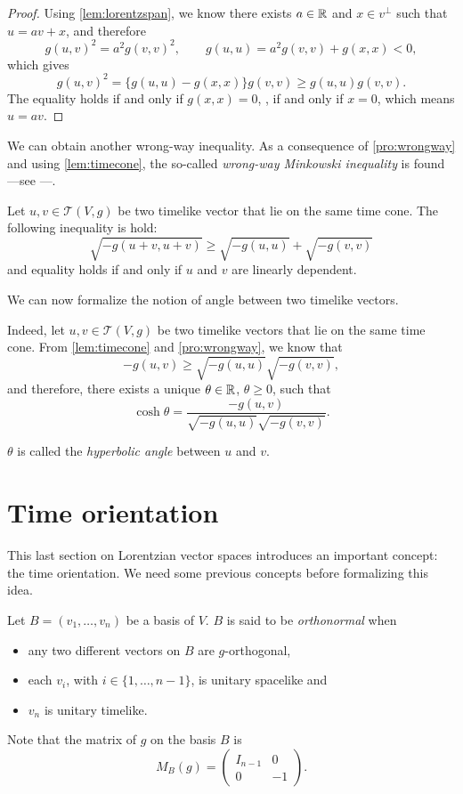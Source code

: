 \begin{proof}
    Using \autoref{lem:lorentzspan}, we know there exists $a \in \mathbb{R}$ and $x \in v^\perp$ such that $u=av+x$, and therefore
    \[
        g(u,v)^2=a^2g(v,v)^2, \quad \quad g(u,u)=a^2g(v,v)+g(x,x)<0,
    \]
    which gives
    \[
        g(u,v)^2=\{g(u,u)-g(x,x)\}g(v,v) \geq g(u,u)g(v,v).
    \]
    The equality holds if and only if $g(x,x)=0$, \ie, if and only if $x=0$, which means $u=av$.
\end{proof}


We can obtain another wrong-way inequality. As a consequence of \autoref{pro:wrongway} and using \autoref{lem:timecone}, the so-called \emph{wrong-way Minkowski inequality} is found ---see \cite[Cor. 5.31]{oneill83}---.

\begin{corollary}
	\label{Minkowski}
    Let $u,v \in \mathcal{T}(V,g)$ be two timelike vector that lie on the same time cone. The following inequality is hold:
    \[
        \sqrt{-g(u+v,u+v)} \geq \sqrt{-g(u,u)}+\sqrt{-g(v,v)}
    \]
    and equality holds if and only if $u$ and $v$ are linearly dependent.
\end{corollary}

We can now formalize the notion of angle between two timelike vectors.

Indeed, let $u, v \in \mathcal{T}(V,g)$ be two timelike vectors that lie on the same time cone. From \autoref{lem:timecone} and \autoref{pro:wrongway}, we know that
\[
-g(u,v) \geq \sqrt{-g(u,u)}\sqrt{-g(v,v)},
\]
and therefore, there exists a unique $\theta \in \mathbb{R}$, $\theta \geq 0$, such that
\[
\cosh \theta =\frac{-g(u,v)}{\sqrt{-g(u,u)}\sqrt{-g(v,v)}}.
\]

$\theta$ is called the \emph{hyperbolic angle} between $u$ and $v$.

\section{Time orientation}

This last section on Lorentzian vector spaces introduces an important concept: the time orientation. We need some previous concepts before formalizing this idea.

\begin{definition}
	Let $B = (v_1, \dots, v_n)$ be a basis of $V$. $B$ is said to be \emph{orthonormal} when
	\begin{itemize}
		\item any two different vectors on $B$ are $g$-orthogonal,
		\item each $v_i$, with $i \in \{1,\dots,n-1\}$, is unitary spacelike and
		\item $v_n$ is unitary timelike.
	\end{itemize}

	Note that the matrix of $g$ on the basis $B$ is
	\[
		M_B(g) = \begin{pmatrix}
			I_{n-1} & 0  \\
			0 & -1
		\end{pmatrix}.
	\]
\end{definition}

